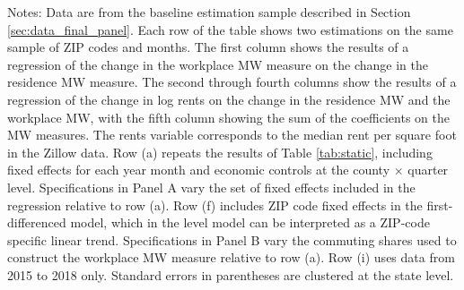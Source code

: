 \begin{landscape}
\begin{table}[ht!]
    \begin{minipage}{.95\linewidth} \footnotesize
        \vspace{2mm}
        Notes: 
        Data are from the baseline estimation sample described in Section 
        \ref{sec:data_final_panel}.
        Each row of the table shows two estimations on the same sample of ZIP 
        codes and months.
        The first column shows the results of a regression of the change in the 
        workplace MW measure on the change in the residence MW measure.
        The second through fourth columns show the results of a regression of 
        the change in log rents on the change in the residence MW and the 
        workplace MW, with the fifth column showing the sum of the coefficients 
        on the MW measures.
        The rents variable corresponds to the median rent per square foot in
        the Zillow data.
        Row (a) repeats the results of Table \ref{tab:static}, including fixed
        effects for each year month and economic controls at the 
        county $\times$ quarter level.
        Specifications in Panel A vary the set of fixed effects included in the 
        regression relative to row (a).
        Row (f) includes ZIP code fixed effects in the first-differenced model,
        which in the level model can be interpreted as a ZIP-code specific 
        linear trend.
        Specifications in Panel B vary the commuting shares used to construct 
        the workplace MW measure relative to row (a).
        Row (i) uses data from 2015 to 2018 only.
        Standard errors in parentheses are clustered at the state level.
    \end{minipage}
\end{table}
\end{landscape}
